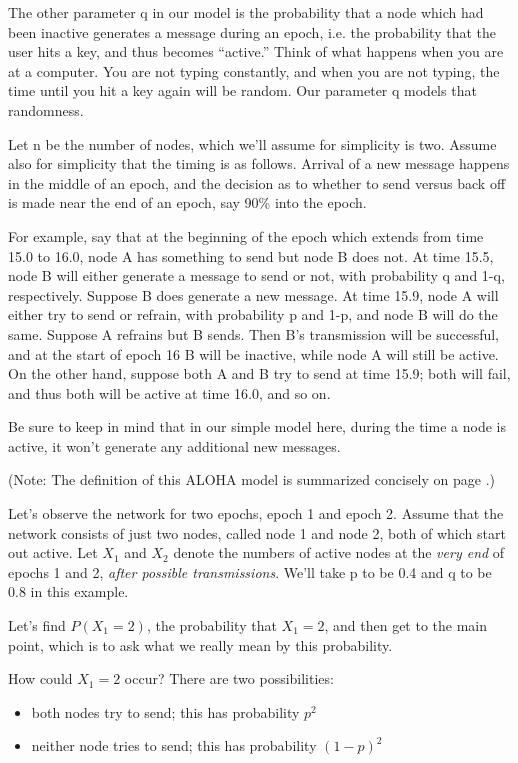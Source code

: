 The other parameter q in our model is the probability that a node which
had been inactive generates a message during an epoch, i.e. the
probability that the user hits a key, and thus becomes ``active.''
Think of what happens when you are at a computer.  You are not typing
constantly, and when you are not typing, the time until you hit a key
again will be random.  Our parameter q models that randomness.

Let n be the number of nodes, which we'll assume for simplicity is two.
Assume also for simplicity that the timing is as follows.  Arrival of a
new message happens in the middle of an epoch, and the decision as to
whether to send versus back off is made near the end of an epoch, say
90\% into the epoch.

For example, say that at the beginning of the epoch which extends from
time 15.0 to 16.0, node A has something to send but node B does not.  At
time 15.5, node B will either generate a message to send or not, with
probability q and 1-q, respectively.  Suppose B does generate a new
message.  At time 15.9, node A will either try to send or refrain, with
probability p and 1-p, and node B will do the same.  Suppose A refrains
but B sends.  Then B's transmission will be successful, and at the start
of epoch 16 B will be inactive, while node A will still be active.  On
the other hand, suppose both A and B try to send at time 15.9; both will
fail, and thus both will be active at time 16.0, and so on.

Be sure to keep in mind that in our simple model here, during the time a
node is active, it won't generate any additional new messages.

(Note:  The definition of this ALOHA model is summarized concisely on
page \pageref{basicprobcomp}.)

Let's observe the network for two epochs, epoch 1 and epoch 2.  Assume
that the network consists of just two nodes, called node 1 and node 2,
both of which start out active.  Let $X_1$ and $X_2$ denote the numbers
of active nodes at the {\it very end} of epochs 1 and 2, {\it after possible
transmissions}.  We'll take p to be 0.4 and q to be 0.8 in this example.

Let's find $P(X_1 = 2)$, the probability that $X_1 = 2$, and then get to
the main point, which is to ask what we really mean by this probability.

How could $X_1 = 2$ occur?  There are two possibilities:

\begin{itemize}

\item both nodes try to send; this has probability $p^2$

\item neither node tries to send; this has probability $(1-p)^2$

\end{itemize}

